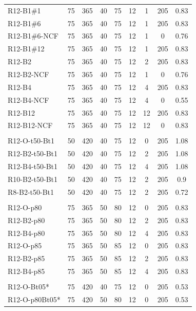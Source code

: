 \begin{table}[]
{\begin{tabular}{@{}lcccccccc@{}}
R12-B1\#1        & 75 & 365 & 40 & 75 & 12 & 1  & 205 & 0.83 \\
R12-B1\#6        & 75 & 365 & 40 & 75 & 12 & 1  & 205 & 0.83 \\
R12-B1\#6-NCF    & 75 & 365 & 40 & 75 & 12 & 1  & 0   & 0.76 \\
R12-B1\#12        & 75 & 365 & 40 & 75 & 12 & 1  & 205 & 0.83 \\
R12-B2         & 75 & 365 & 40 & 75 & 12 & 2  & 205 & 0.83 \\
R12-B2-NCF     & 75 & 365 & 40 & 75 & 12 & 1  & 0   & 0.76 \\
R12-B4         & 75 & 365 & 40 & 75 & 12 & 4  & 205 & 0.83 \\
R12-B4-NCF     & 75 & 365 & 40 & 75 & 12 & 4  & 0   & 0.55 \\
R12-B12        & 75 & 365 & 40 & 75 & 12 & 12 & 205 & 0.83 \\
R12-B12-NCF    & 75 & 365 & 40 & 75 & 12 & 12 & 0   & 0.83 \\
               &    &     &    &    &    &    &     &      \\
R12-O-t50-Bt1  & 50 & 420 & 40 & 75 & 12 & 0  & 205 & 1.08 \\
R12-B2-t50-Bt1 & 50 & 420 & 40 & 75 & 12 & 2  & 205 & 1.08 \\
R12-B4-t50-Bt1 & 50 & 420 & 40 & 75 & 12 & 4  & 205 & 1.08 \\
R10-B2-t50-Bt1 & 50 & 420 & 40 & 75 & 12 & 2  & 205 & 0.9  \\
R8-B2-t50-Bt1  & 50 & 420 & 40 & 75 & 12 & 2  & 205 & 0.72 \\
               &    &     &    &    &    &    &     &      \\
R12-O-p80   & 75 & 365 & 50 & 80 & 12 & 0  & 205 & 0.83 \\
R12-B2-p80  & 75 & 365 & 50 & 80 & 12 & 2  & 205 & 0.83 \\
R12-B4-p80  & 75 & 365 & 50 & 80 & 12 & 4  & 205 & 0.83 \\
R12-O-p85   & 75 & 365 & 50 & 85 & 12 & 0  & 205 & 0.83 \\
R12-B2-p85  & 75 & 365 & 50 & 85 & 12 & 2  & 205 & 0.83 \\
R12-B4-p85  & 75 & 365 & 50 & 85 & 12 & 4  & 205 & 0.83 \\
               &    &     &    &    &    &    &     &      \\
R12-O-Bt05*   & 75 & 420 & 40 & 75 & 12 & 0  & 205 & 0.53 \\
R12-O-p80Bt05* & 75 & 420 & 50 & 80 & 12 & 0  & 205 & 0.53 \\

\end{tabular}}
\end{table}
